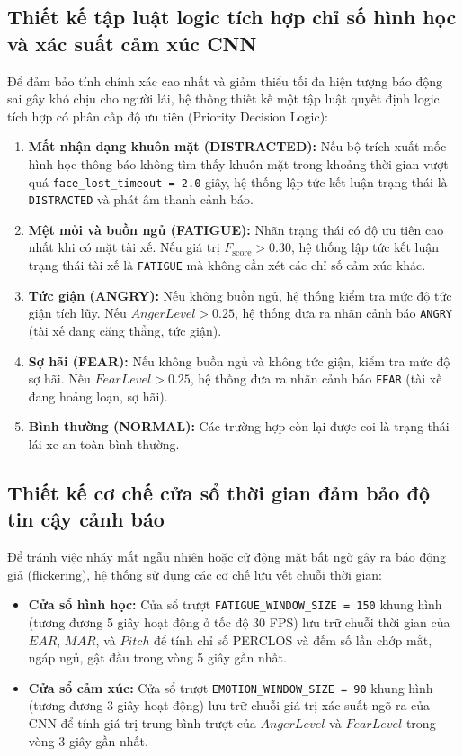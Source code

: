 \documentclass[../DoAn.tex]{subfiles}
\begin{document}
\subsection{Thiết kế tập luật logic tích hợp chỉ số hình học và xác suất cảm xúc CNN}
Để đảm bảo tính chính xác cao nhất và giảm thiểu tối đa hiện tượng báo động sai gây khó chịu cho người lái, hệ thống thiết kế một tập luật quyết định logic tích hợp có phân cấp độ ưu tiên (Priority Decision Logic):
\begin{enumerate}
    \item \textbf{Mất nhận dạng khuôn mặt (DISTRACTED):} Nếu bộ trích xuất mốc hình học thông báo không tìm thấy khuôn mặt trong khoảng thời gian vượt quá \texttt{face\_lost\_timeout = 2.0} giây, hệ thống lập tức kết luận trạng thái là \texttt{DISTRACTED} và phát âm thanh cảnh báo.
    \item \textbf{Mệt mỏi và buồn ngủ (FATIGUE):} Nhãn trạng thái có độ ưu tiên cao nhất khi có mặt tài xế. Nếu giá trị $F_{\text{score}} > 0.30$, hệ thống lập tức kết luận trạng thái tài xế là \texttt{FATIGUE} mà không cần xét các chỉ số cảm xúc khác.
    \item \textbf{Tức giận (ANGRY):} Nếu không buồn ngủ, hệ thống kiểm tra mức độ tức giận tích lũy. Nếu $AngerLevel > 0.25$, hệ thống đưa ra nhãn cảnh báo \texttt{ANGRY} (tài xế đang căng thẳng, tức giận).
    \item \textbf{Sợ hãi (FEAR):} Nếu không buồn ngủ và không tức giận, kiểm tra mức độ sợ hãi. Nếu $FearLevel > 0.25$, hệ thống đưa ra nhãn cảnh báo \texttt{FEAR} (tài xế đang hoảng loạn, sợ hãi).
    \item \textbf{Bình thường (NORMAL):} Các trường hợp còn lại được coi là trạng thái lái xe an toàn bình thường.
\end{enumerate}

\subsection{Thiết kế cơ chế cửa sổ thời gian đảm bảo độ tin cậy cảnh báo}
Để tránh việc nháy mắt ngẫu nhiên hoặc cử động mặt bất ngờ gây ra báo động giả (flickering), hệ thống sử dụng các cơ chế lưu vết chuỗi thời gian:
\begin{itemize}
    \item \textbf{Cửa sổ hình học:} Cửa sổ trượt \texttt{FATIGUE\_WINDOW\_SIZE = 150} khung hình (tương đương 5 giây hoạt động ở tốc độ 30 FPS) lưu trữ chuỗi thời gian của $EAR$, $MAR$, và $Pitch$ để tính chỉ số PERCLOS và đếm số lần chớp mắt, ngáp ngủ, gật đầu trong vòng 5 giây gần nhất.
    \item \textbf{Cửa sổ cảm xúc:} Cửa sổ trượt \texttt{EMOTION\_WINDOW\_SIZE = 90} khung hình (tương đương 3 giây hoạt động) lưu trữ chuỗi giá trị xác suất ngõ ra của CNN để tính giá trị trung bình trượt của $AngerLevel$ và $FearLevel$ trong vòng 3 giây gần nhất.
\end{itemize}
\end{document}
